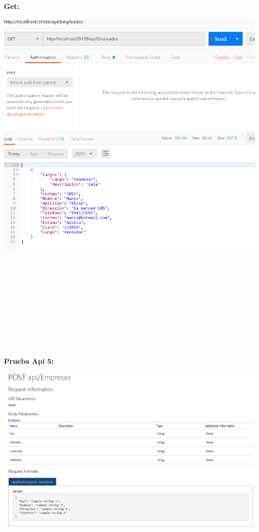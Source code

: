 \begin{flushleft}
\textbf{}\\
\textbf{}\\
\textbf{}\\
\textbf{Get:}\\
\begin{center}
	\includegraphics[width=19cm]{./Imagenes/get4} 
	\end{center}
\textbf{}\\
\textbf{}\\
\textbf{}\\
\textbf{}\\
\textbf{}\\
\textbf{}\\
\textbf{}\\
\textbf{}\\
\textbf{}\\
\textbf{}\\
\textbf{Prueba Api 5:}\\
\begin{center}
	\includegraphics[width=19cm]{./Imagenes/api5} 

\end{center}
\end{flushleft}
